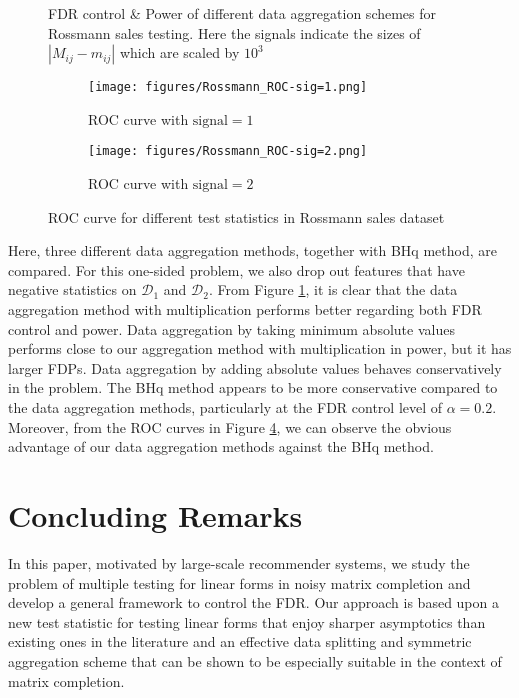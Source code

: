 \documentclass[12pt]{article}
\newcommand{\abs}[1]{\left\lvert#1\right\rvert}
\newcommand{\cD}{\mathcal{D}}
\theoremstyle{plain}
\begin{document}
\begin{sloppypar}
\begin{figure}
\begin{subfigure}{1\textwidth}
 \end{subfigure}

 \caption{FDR control \& Power of different data aggregation schemes for Rossmann sales testing. Here the signals indicate the sizes of $\abs{M_{ij}-m_{ij} }$ which are scaled  by $10^3$}
 \label{fig:fdr-Rossmann}

\end{figure}

  \begin{figure}
  \centering
\begin{subfigure}{0.45\textwidth}
         \texttt{[image: figures/Rossmann\_ROC-sig=1.png]}
     \caption{ROC curve with $\text{signal} = 1$}
     \label{fig:fdr-fdr-Rossmann-roc-1}
\end{subfigure}
\begin{subfigure}{0.45\textwidth}
         \texttt{[image: figures/Rossmann\_ROC-sig=2.png]}
     \caption{ROC curve with $\text{signal} = 2$}
     \label{fig:fdr-fdr-Rossmann-roc-2}
\end{subfigure}
\caption{ROC curve for different test statistics in Rossmann sales dataset}
     \label{fig:fdr-Rossmann-roc}
     \end{figure}
Here, three different data aggregation methods, together with BHq method, are compared. For this one-sided problem, we also drop out features that have negative statistics on $\cD_1$ and $\cD_2$. From Figure \ref{fig:fdr-Rossmann}, it is clear that the data aggregation method with multiplication performs better regarding both FDR control and power. Data aggregation by taking minimum absolute values performs close to our aggregation method with multiplication in power, but it has larger FDPs. Data aggregation by adding absolute values behaves conservatively in the problem. The BHq method appears to be more conservative compared to the data aggregation methods, particularly at the FDR control level of $\alpha = 0.2$. Moreover, from the ROC curves in Figure \ref{fig:fdr-Rossmann-roc}, we can observe the obvious advantage of our data aggregation methods against the BHq method.



\section{Concluding Remarks}\label{sec:remark}
In this paper, motivated by large-scale recommender systems, we study the problem of multiple testing for linear forms in noisy matrix completion and develop a general framework to control the FDR. Our approach is based upon a new test statistic for testing linear forms that enjoy sharper asymptotics than existing ones in the literature and an effective data splitting and symmetric aggregation scheme that can be shown to be especially suitable in the context of matrix completion.


\end{sloppypar}
\end{document}
